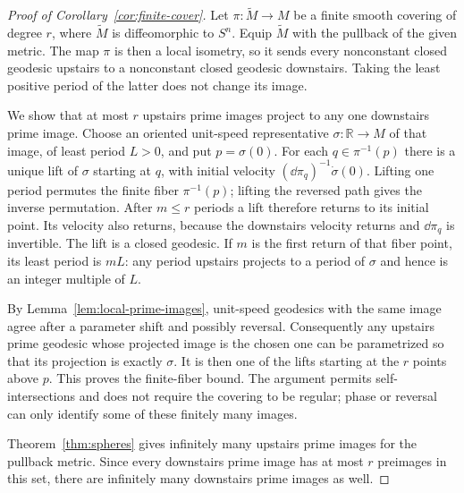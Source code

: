 \begin{proof}[Proof of Corollary~\ref{cor:finite-cover}]
Let $\pi:\widetilde M\to M$ be a finite smooth covering of degree $r$,
where $\widetilde M$ is diffeomorphic to $S^n$.  Equip $\widetilde M$
with the pullback of the given metric.  The map $\pi$ is then a local
isometry, so it sends every nonconstant closed geodesic upstairs to a
nonconstant closed geodesic downstairs.  Taking the least positive
period of the latter does not change its image.

We show that at most $r$ upstairs prime images project to any one
downstairs prime image.  Choose an oriented unit-speed representative
$\sigma:\mathbb R\to M$ of that image, of least period $L>0$, and
put $p=\sigma(0)$.  For each $q\in\pi^{-1}(p)$ there is a unique lift
of $\sigma$ starting at $q$, with initial velocity
$(\dd\pi_q)^{-1}\dot\sigma(0)$.  Lifting one period permutes the finite
fiber $\pi^{-1}(p)$; lifting the reversed path gives the inverse
permutation.  After $m\le r$ periods a lift therefore returns to its
initial point.  Its velocity also returns, because the downstairs
velocity returns and $\dd\pi_q$ is invertible.  The lift is a closed
geodesic.  If $m$ is the first return of that fiber point, its least
period is $mL$: any period upstairs projects to a period of $\sigma$
and hence is an integer multiple of $L$.

By Lemma~\ref{lem:local-prime-images}, unit-speed geodesics with the
same image agree after a parameter shift and possibly reversal.
Consequently any upstairs prime geodesic whose projected image is the
chosen one can be parametrized so that its projection is exactly
$\sigma$.  It is then one of the lifts starting at the $r$ points
above $p$.  This proves the finite-fiber bound.  The argument permits
self-intersections and does not require the covering to be regular;
phase or reversal can only identify some of these finitely many images.

Theorem~\ref{thm:spheres} gives infinitely many upstairs prime images
for the pullback metric.  Since every downstairs prime image has at
most $r$ preimages in this set, there are infinitely many downstairs
prime images as well.
\end{proof}
